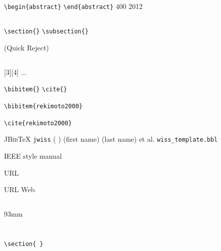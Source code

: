 \documentclass{article}
\begin{document}
 

 \verb|\begin{abstract}| \verb|\end{abstract}| 
400 2012 

\subsection{ }

\verb|\section{}| \verb|\subsection{}| 
  \LaTeXe  

  (Quick Reject) 

\subsection{ }
 [3][4] ... 
 
 \verb|\bibitem{}| \verb|\cite{}|
 

 

\verb|\bibitem{rekimoto2000}| 

 \verb|\cite{rekimoto2000}| \cite{rekimoto2000} 

 \textsc{JBib}\TeX  
 \verb|jwiss| 
 ( ) 
 (first name)  
 (last name) et al. 
 \verb|wiss_template.bbl| 
 
 IEEE style manual 

 URL 
 
 URL  
 Web 

\subsection{ }
 
 
 
 93mm 

\section{ }

\verb|\section{ }| 
\end{document}
